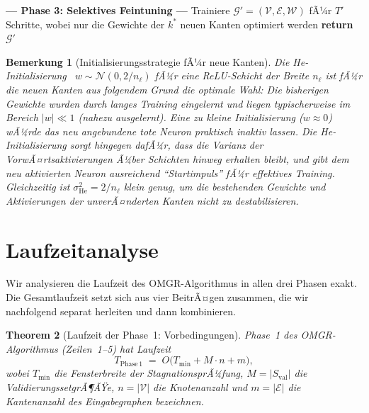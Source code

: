 ﻿\documentclass[12pt, a4paper, openany]{report}
\newtheorem{theorem}{Theorem}[chapter]
\newtheorem{remark}[theorem]{Bemerkung}
\newcommand{\calG}{\mathcal{G}}
\newcommand{\calN}{\mathcal{N}}
\newcommand{\calV}{\mathcal{V}}
\newcommand{\calE}{\mathcal{E}}
\newcommand{\calW}{\mathcal{W}}
\begin{document}
\begin{algorithm}[H]
\begin{algorithmic}[1]
\Statex \textbf{--- Phase 3: Selektives Feintuning ---}
\State Trainiere $\calG' = (\calV, \calE, \calW)$ fÃ¼r $T'$ Schritte,
       wobei nur die Gewichte der $k^*$ neuen Kanten optimiert werden
\State \textbf{return} $\calG'$
\end{algorithmic}
\end{algorithm}

\begin{remark}[Initialisierungsstrategie fÃ¼r neue Kanten]
\label{rem:he_init}
Die He-Initialisierung~\cite{he2015delving}
$w \sim \calN(0, 2/n_\ell)$ fÃ¼r eine ReLU-Schicht der Breite $n_\ell$
ist fÃ¼r die neuen Kanten aus folgendem Grund die optimale Wahl:
Die bisherigen Gewichte wurden durch langes Training eingelernt und liegen
typischerweise im Bereich $|w| \ll 1$ (nahezu ausgelernt).  Eine zu
kleine Initialisierung ($w \approx 0$) wÃ¼rde das neu angebundene tote
Neuron praktisch inaktiv lassen.  Die He-Initialisierung sorgt hingegen
dafÃ¼r, dass die Varianz der VorwÃ¤rtsaktivierungen Ã¼ber Schichten hinweg
erhalten bleibt, und gibt dem neu aktivierten Neuron ausreichend
``Startimpuls'' fÃ¼r effektives Training.  Gleichzeitig ist
$\sigma_{\mathrm{He}}^2 = 2/n_\ell$ klein genug, um die bestehenden
Gewichte und Aktivierungen der unverÃ¤nderten Kanten nicht zu destabilisieren.
\end{remark}

\section{Laufzeitanalyse}
\label{sec:algo_runtime}

Wir analysieren die Laufzeit des OMGR-Algorithmus in allen drei Phasen
exakt.  Die Gesamtlaufzeit setzt sich aus vier BeitrÃ¤gen zusammen, die
wir nachfolgend separat herleiten und dann kombinieren.

\begin{theorem}[Laufzeit der Phase~1: Vorbedingungen]
\label{thm:runtime_phase1}
Phase~1 des OMGR-Algorithmus (Zeilen~1--5) hat Laufzeit
\begin{equation}
  \label{eq:runtime_phase1}
  T_{\mathrm{Phase\,1}} \;=\; O\!\bigl(T_{\min} + M \cdot n + m\bigr),
\end{equation}
wobei $T_{\min}$ die Fensterbreite der StagnationsprÃ¼fung,
$M = |S_{\mathrm{val}}|$ die ValidierungssetgrÃ¶ÃŸe,
$n = |\calV|$ die Knotenanzahl und
$m = |\calE|$ die Kantenanzahl des Eingabegraphen bezeichnen.
\end{theorem}
\end{document}

